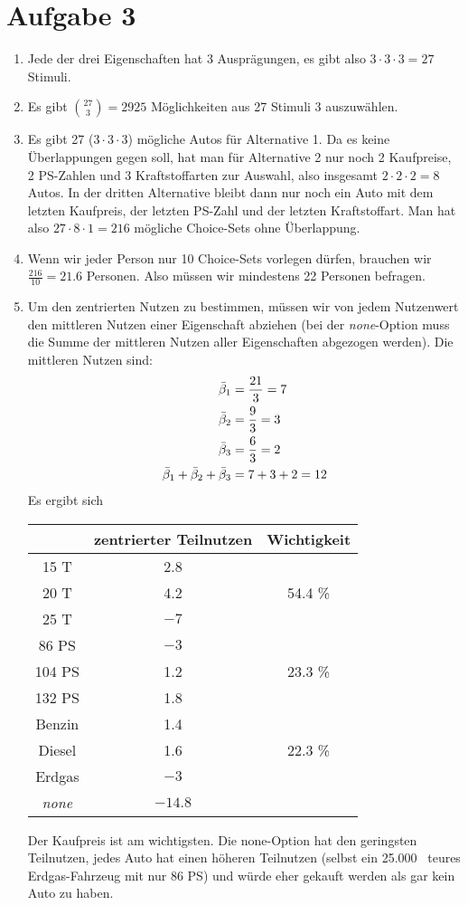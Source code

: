 \documentclass{article}
\begin{document}
	\section*{Aufgabe 3}
	\begin{enumerate}[label=(\alph*)]
		\item Jede der drei Eigenschaften hat 3 Ausprägungen, es gibt also $3\cdot 3\cdot 3=27$ Stimuli.
		\item Es gibt $\binom{27}{3}=2925$ Möglichkeiten aus 27 Stimuli 3 auszuwählen.
		\item Es gibt 27 ($3\cdot 3\cdot 3$) mögliche Autos für Alternative 1. Da es keine Überlappungen gegen soll, hat man für Alternative 2 nur noch 2 Kaufpreise, 2 PS-Zahlen und 3 Kraftstoffarten zur Auswahl, also insgesamt $2\cdot 2\cdot 2=8$ Autos. In der dritten Alternative bleibt dann nur noch ein Auto mit dem letzten Kaufpreis, der letzten PS-Zahl und der letzten Kraftstoffart. Man hat also $27\cdot 8\cdot 1 = 216$ mögliche Choice-Sets ohne Überlappung.
		\item Wenn wir jeder Person nur 10 Choice-Sets vorlegen dürfen, brauchen wir $\frac{216}{10}=21.6$ Personen. Also müssen wir mindestens 22 Personen befragen.
		\item Um den zentrierten Nutzen zu bestimmen, müssen wir von jedem Nutzenwert den mittleren Nutzen einer Eigenschaft abziehen (bei der \textit{none}-Option muss die Summe der mittleren Nutzen aller Eigenschaften abgezogen werden). Die mittleren Nutzen sind:
		\begin{align}
			\bar{\beta}_1 &= \frac{21}{3} = 7 \notag \\
			\bar{\beta}_2 &= \frac{9}{3} = 3 \notag \\
			\bar{\beta}_3 &= \frac{6}{3} = 2 \notag \\
			\bar{\beta}_1 + \bar{\beta}_2 + \bar{\beta}_3 &= 7+3+2=12 \notag
		\end{align}
		Es ergibt sich
		\begin{center}
			\begin{tabular}{c|c|c}
				& zentrierter Teilnutzen & Wichtigkeit \\
				\hline
				15 T\EUR & 2.8 & \\
				20 T\EUR & 4.2 & 54.4 \% \\
				25 T\EUR & $-7$ & \\
				\hline
				86 PS & $-3$ & \\
				104 PS & 1.2 & 23.3 \% \\
				132 PS & 1.8 & \\
				\hline
				Benzin & 1.4 & \\
				Diesel & 1.6 & 22.3 \% \\
				Erdgas & $-3$ & \\
				\hline
				\textit{none} & $-14.8$ &
			\end{tabular}
		\end{center}
		Der Kaufpreis ist am wichtigsten. Die none-Option hat den geringsten Teilnutzen, jedes Auto hat einen höheren Teilnutzen (selbst ein 25.000 \EUR\, teures Erdgas-Fahrzeug mit nur 86 PS) und würde eher gekauft werden als gar kein Auto zu haben.
	\end{enumerate}
	
\end{document}
